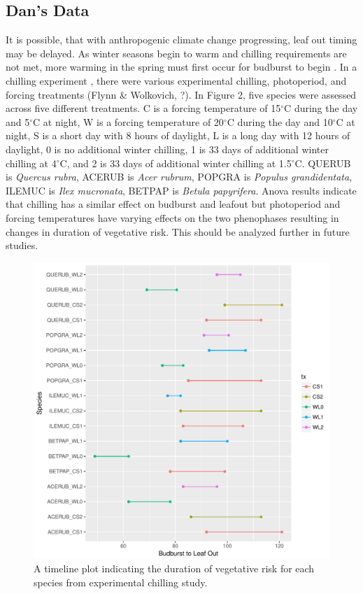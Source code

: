 \documentclass{article}\usepackage[]{graphicx}\usepackage[]{color}
\makeatletter
\def\maxwidth{ %
  \ifdim\Gin@nat@width>\linewidth
    \linewidth
  \else
    \Gin@nat@width
  \fi
}
\makeatother
\begin{document}
\subsection*{Dan's Data}
It is possible, that with anthropogenic climate change progressing, leaf out timing may be delayed. As winter seasons begin to warm and chilling requirements are not met, more warming in the spring must first occur for budburst to begin \citep{Chuine2010, Polgar2014, Fu2012, Morin2009, McCreary1990}. In a chilling experiment , there were various experimental chilling, photoperiod, and forcing treatments (Flynn \& Wolkovich, ?). In Figure 2, five species were assessed across five different treatments. C is a forcing temperature of 15$^{\circ}$C during the day and 5$^{\circ}$C at night, W is a forcing temperature of 20$^{\circ}$C during the day and 10$^{\circ}$C at night, S is a short day with 8 hours of daylight, L is a long day with 12 hours of daylight, 0 is no additional winter chilling, 1 is 33 days of additional winter chilling at 4$^{\circ}$C, and 2 is 33 days of additional winter chilling at 1.5$^{\circ}$C. QUERUB is \textit{Quercus rubra}, ACERUB is \textit{Acer rubrum}, POPGRA is \textit{Populus grandidentata}, ILEMUC is \textit{Ilex mucronata}, BETPAP is \textit{Betula papyrifera}. Anova results indicate that chilling has a similar effect on budburst and leafout but photoperiod and forcing temperatures have varying effects on the two phenophases resulting in changes in duration of vegetative risk. This should be analyzed further in future studies. 

\begin{figure}[H]
\includegraphics[width=\maxwidth]{figure/chilling-1} \caption[A timeline plot indicating the duration of vegetative risk for each species from experimental chilling study]{A timeline plot indicating the duration of vegetative risk for each species from experimental chilling study.}\label{fig:chilling}
\end{figure}
\end{document}
